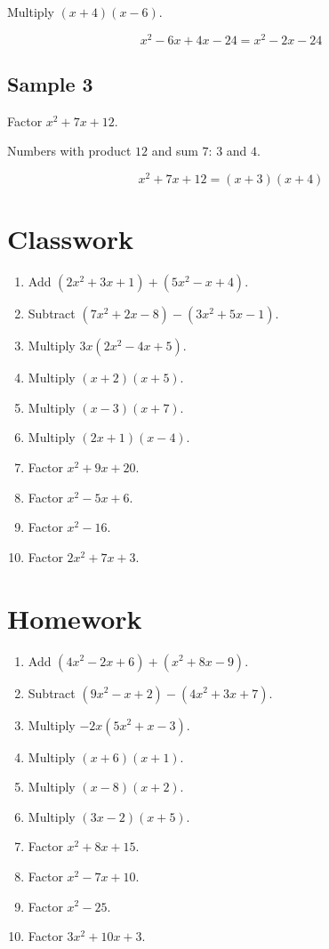 \documentclass[11pt]{book}
\begin{document}
Multiply \((x+4)(x-6)\).

\[x^2-6x+4x-24=x^2-2x-24\]

\subsection{Sample 3}

Factor \(x^2+7x+12\).

Numbers with product \(12\) and sum \(7\): \(3\) and \(4\).

\[x^2+7x+12=(x+3)(x+4)\]

\section{Classwork}

\begin{enumerate}
\item Add \((2x^2+3x+1)+(5x^2-x+4)\).
\item Subtract \((7x^2+2x-8)-(3x^2+5x-1)\).
\item Multiply \(3x(2x^2-4x+5)\).
\item Multiply \((x+2)(x+5)\).
\item Multiply \((x-3)(x+7)\).
\item Multiply \((2x+1)(x-4)\).
\item Factor \(x^2+9x+20\).
\item Factor \(x^2-5x+6\).
\item Factor \(x^2-16\).
\item Factor \(2x^2+7x+3\).
\end{enumerate}

\section{Homework}

\begin{enumerate}
\item Add \((4x^2-2x+6)+(x^2+8x-9)\).
\item Subtract \((9x^2-x+2)-(4x^2+3x+7)\).
\item Multiply \(-2x(5x^2+x-3)\).
\item Multiply \((x+6)(x+1)\).
\item Multiply \((x-8)(x+2)\).
\item Multiply \((3x-2)(x+5)\).
\item Factor \(x^2+8x+15\).
\item Factor \(x^2-7x+10\).
\item Factor \(x^2-25\).
\item Factor \(3x^2+10x+3\).
\end{enumerate}
\end{document}
